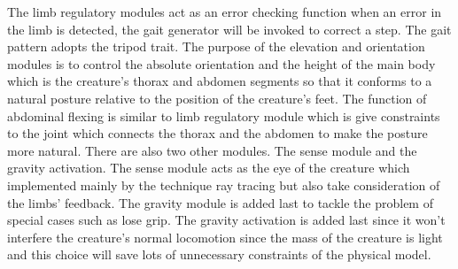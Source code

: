 The limb regulatory modules act as an error checking function when an error in the limb is detected, the
gait generator will be invoked to correct a step. The gait pattern adopts the tripod trait. 
The purpose of the elevation and orientation modules is to control the absolute
orientation and the height of the main body which is the creature's
thorax and abdomen segments so that it conforms to a natural posture
relative to the position of the creature's feet. The function of abdominal flexing
is similar to limb regulatory module which is give constraints to the
joint which connects the thorax and the abdomen to make the posture
more natural. 
There are also two other modules. The sense module and the gravity activation.
The sense module acts as the eye of the creature which implemented mainly by the technique ray tracing but also take consideration of the limbs' feedback. The gravity module is added last to tackle the problem of special cases such as lose grip. The gravity activation is added last since it won't interfere the creature's normal locomotion since the mass of the creature is light and this choice will save lots of unnecessary constraints of the physical model\cite{thesis}.
